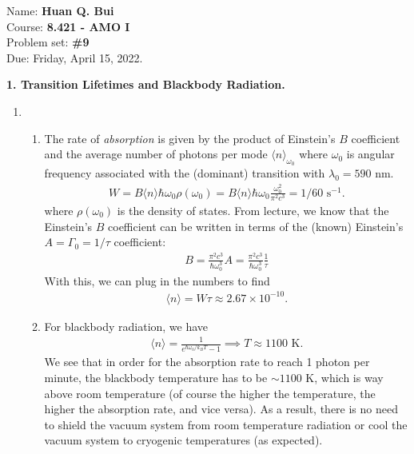 \documentclass{article}
\theoremstyle{definition}
\newcommand{\f}[2]{\frac{#1}{#2}}
\begin{document}
\begin{framed}
\noindent Name: \textbf{Huan Q. Bui}\\
Course: \textbf{8.421 - AMO I}\\
Problem set: \textbf{\#9}\\
Due: Friday, April 15, 2022.
\end{framed}



\textbf{1. Transition Lifetimes and Blackbody Radiation. }

\begin{enumerate}[label=(\alph*)]
	\item 
	
	\begin{enumerate}[label=(\roman*)]
		\item The rate of \textit{absorption} is given by the product of Einstein's $B$ coefficient and the average number of photons per mode $\langle n \rangle_{\omega_0}$ where $\omega_0$ is angular frequency associated with the (dominant) transition with $\lambda_0 = 590$ nm. 
		\begin{align*}
		W = B\langle n \rangle \hbar \omega_0 \rho(\omega_0) = B\langle n \rangle \hbar \omega_0 \f{\omega_0^2}{\pi^2 c^3}   = 1/60 \text{ s}^{-1}.
		\end{align*} 
	where $\rho(\omega_0)$ is the density of states. From lecture, we know that the Einstein's $B$ coefficient can be written in terms of the (known) Einstein's $A = \Gamma_0 = 1/\tau$ coefficient:
		\begin{align*}
		B = \f{\pi^2 c^3}{\hbar \omega_0^3}A = \f{\pi^2 c^3}{\hbar \omega_0^3}\f{1}{\tau}
		\end{align*}
		With this, we can plug in the numbers to find 
		\begin{align*}
		\langle n \rangle = W \tau  \approx 2.67 \times 10^{-10}.
		\end{align*}
		
		
		
		\item For blackbody radiation, we have
		\begin{align*}
		\langle n \rangle = \f{1}{e^{\hbar \omega_0 / k_BT} - 1} \implies T\approx 1100 \text{ K}.
		\end{align*}
		We see that in order for the absorption rate to reach 1 photon per minute, the blackbody temperature has to be $\sim 1100$ K, which is way above room temperature (of course the higher the temperature, the higher the absorption rate, and vice versa). As a result, there is no need to shield the vacuum system from room temperature radiation or cool the vacuum system to cryogenic temperatures (as expected).
	\end{enumerate}
	

\end{enumerate}
\end{document}
